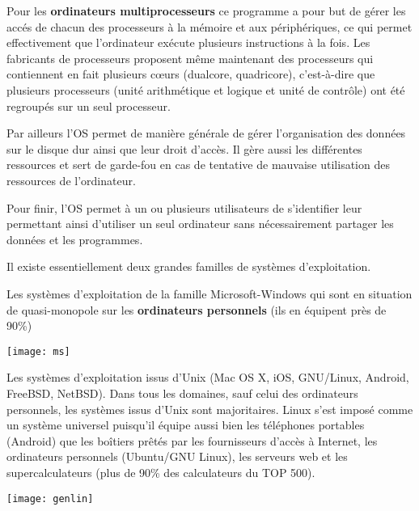 Pour les \textbf{ordinateurs multiprocesseurs} ce programme a pour but de gérer les accés de chacun des processeurs à la mémoire et aux périphériques, ce qui permet
effectivement que l’ordinateur exécute plusieurs instructions à la fois. Les fabricants
de processeurs proposent même maintenant des processeurs qui contiennent en fait plusieurs
c\oe{}urs (dualcore, quadricore), c’est-à-dire que plusieurs processeurs (unité arithmétique
et logique et unité de contrôle) ont été regroupés sur un seul processeur.

Par ailleurs l'OS permet de manière générale de gérer l'organisation des données sur le disque dur ainsi que leur droit d'accès. Il gère aussi les différentes ressources et sert de garde-fou en cas de tentative de mauvaise utilisation des ressources de l'ordinateur.

Pour finir, l'OS permet à un ou plusieurs utilisateurs de s'identifier leur permettant ainsi d'utiliser un seul ordinateur sans nécessairement partager les données et les programmes. 


Il existe essentiellement deux grandes familles de systèmes d’exploitation. 

\begin{minipage}[c]{.7\linewidth}
Les systèmes d’exploitation de la famille Microsoft-Windows qui sont en situation de quasi-monopole sur les \textbf{ordinateurs personnels} (ils en équipent près de 90\%)

\end{minipage} \hfill
\begin{minipage}[c]{.25\linewidth}
\begin{center}
\texttt{[image: ms]}
\end{center}
\end{minipage} 

\begin{minipage}[c]{.7\linewidth}
Les systèmes d’exploitation issus d’Unix (Mac OS X, iOS, GNU/Linux, Android, FreeBSD, NetBSD). Dans tous les domaines, sauf celui des ordinateurs personnels, les systèmes issus d’Unix sont majoritaires.  Linux s’est imposé comme un système universel puisqu’il équipe aussi bien les téléphones portables (Android) que les boîtiers prêtés par les fournisseurs d’accès à Internet, les ordinateurs personnels (Ubuntu/GNU Linux), les serveurs web et les supercalculateurs (plus de 90\% des calculateurs du TOP 500).

\end{minipage} \hfill
\begin{minipage}[c]{.25\linewidth}
\begin{center}
\texttt{[image: genlin]}
\end{center}
\end{minipage} 

